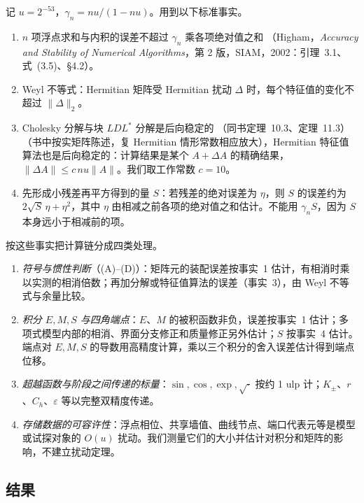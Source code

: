 \documentclass[11pt,a4paper,fontset=fandol]{ctexart}
\begin{document}
记 $u=2^{-53}$，$\gamma_n=nu/(1-nu)$。用到以下标准事实。
\begin{enumerate}
\item $n$ 项浮点求和与内积的误差不超过 $\gamma_n$ 乘各项绝对值之和 （Higham，\emph{Accuracy and Stability of Numerical Algorithms}，第 2 版，SIAM，2002：引理~3.1、式~(3.5)、\S4.2）。
\item Weyl 不等式：Hermitian 矩阵受 Hermitian 扰动 $\Delta$ 时，每个特征值的变化不超过 $\|\Delta\|_2$。
\item Cholesky 分解与块 $LDL^*$ 分解是后向稳定的 （同书定理~10.3、定理~11.3）（书中按实矩阵陈述，复 Hermitian 情形常数相应放大），Hermitian 特征值算法也是后向稳定的：计算结果是某个 $A+\Delta A$ 的精确结果，$\|\Delta A\|\le c\,nu\|A\|$。我们取工作常数 $c=10$。
\item 先形成小残差再平方得到的量 $S$：若残差的绝对误差为 $\eta$，则 $S$ 的误差约为 $2\sqrt S\,\eta+\eta^2$，其中 $\eta$ 由相减之前各项的绝对值之和估计。不能用 $\gamma_nS$，因为 $S$ 本身远小于相减前的项。
\end{enumerate}
按这些事实把计算链分成四类处理。
\begin{enumerate}
\item \emph{符号与惯性判断}（(A)--(D)）：矩阵元的装配误差按事实~1 估计，有相消时乘以实测的相消倍数；再加分解或特征值算法的误差（事实~3），由 Weyl 不等式与余量比较。
\item \emph{积分 $E,M,S$ 与四角端点}：$E$、$M$ 的被积函数非负，误差按事实~1 估计；多项式模型内部的相消、界面分支修正和质量修正另外估计；$S$ 按事实~4 估计。端点对 $E,M,S$ 的导数用高精度计算，乘以三个积分的舍入误差估计得到端点位移。
\item \emph{超越函数与阶段之间传递的标量}：$\sin,\cos,\exp,\sqrt{\cdot}$ 按约 1 ulp 计；$K_\pm$、$r$、$C_h$、$\varepsilon$ 等以完整双精度传递。
\item \emph{存储数据的可容许性}：浮点相位、共享墙值、曲线节点、端口代表元等是模型或试探对象的 $O(u)$ 扰动。我们测量它们的大小并估计对积分和矩阵的影响，不建立扰动定理。
\end{enumerate}

\subsection{结果}
\end{document}
